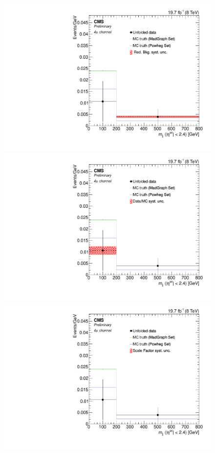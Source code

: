 \begin{figure}[hbtp]
\begin{center}
    \includegraphics[width=0.8\cmsFigWidth]{Figures/Unfolding/Systematics/ZZTo4m_CentralMjj_RedBkg_Mad_fr}     
    \includegraphics[width=0.8\cmsFigWidth]{Figures/Unfolding/Systematics/ZZTo4m_CentralMjj_UnfDataOverGenMC_Mad_fr}     
    \includegraphics[width=0.8\cmsFigWidth]{Figures/Unfolding/Systematics/ZZTo4m_CentralMjj_SFSq_Mad_fr}

\end{center}
\end{figure}
